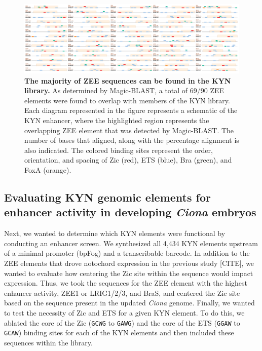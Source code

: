 \begin{landscape}
    \begin{figure}[h]
        \centering
        \includegraphics[scale=0.12]{3_figures-and-files/Fig1_ZEE-Comparison.png}
        \caption[The majority of ZEE sequences can be found in the KYN library]{\textbf{The majority of ZEE sequences can be found in the KYN library.} 
        As determined by Magic-BLAST, a total of 69/90 ZEE elements were found to overlap with members of the KYN library. Each diagram represented in the figure represents a schematic of the KYN enhancer, where the highlighted region represents the overlapping ZEE element that was detected by Magic-BLAST. The number of bases that aligned, along with the percentage alignment is also indicated. The colored binding sites represent the order, orientation, and spacing of Zic (red), ETS (blue), Bra (green), and FoxA (orange).}
        \label{fig:1 zee comparison}
    \end{figure}
\end{landscape}

\subsection{Evaluating KYN genomic elements for enhancer activity in developing \textit{Ciona} embryos}

Next, we wanted to determine which KYN elements were functional by conducting an enhancer screen. We synthesized all 4,434 KYN elements upstream of a minimal promoter (bpFog) and a transcribable barcode. In addition to the ZEE elements that drove notochord expression in the previous study [CITE], we wanted to evaluate how centering the Zic site within the sequence would impact expression. Thus, we took the sequences for the ZEE element with the highest enhancer activity, ZEE1 or LRIG1/2/3, and BraS, and centered the Zic site based on the sequence present in the updated \textit{Ciona} genome. Finally, we wanted to test the necessity of Zic and ETS for a given KYN element. To do this, we ablated the core of the Zic (\verb|GCWG| to \verb|GAWG|) and the core of the ETS (\verb|GGAW| to \verb|GCAW|) binding sites for each of the KYN elements and then included these sequences within the library. 

